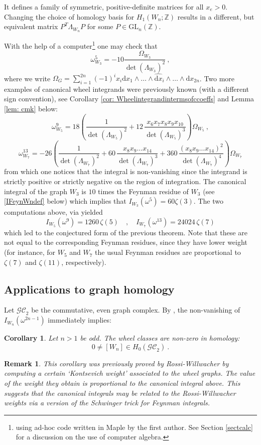 \documentclass[10pt]{amsart}
\newcommand{\ZZ}{{\mathbb Z}}
\newcommand{\dd}{\mathrm{d}}
\theoremstyle{plain}
\newtheorem{cor}[thm]{Corollary}
\newtheorem{remark}[thm]{Remark}
\newcommand{\GL}{\mathrm{GL}}
\newcommand{\GC}{\mathcal{GC}}
\newcommand{\0}{\color{blue}{\mathsf{0}}}
\begin{document}
\noindent 
It defines a family of symmetric, positive-definite matrices for all $x_e>0.$ Changing the choice of homology basis for $H_1(W_n;\ZZ)$ results in a different, but equivalent matrix $P^T \Lambda_{W_n} P$ for some $P \in \GL_n(\ZZ).$

With the help of a computer\footnote{using ad-hoc code written in Maple by the first author. See Section \ref{sectcalc} for a discussion on the use of computer algebra.} one may check that 
\[  \omega^5_{W_3} = -10 \frac{\Omega_{W_3}}{\det(\Lambda_{W_3})^2}\ ,\]
where we write $\Omega_G = \sum_{i=1}^{2n} (-1)^i x_i \dd x_1  \wedge \ldots \wedge \widehat{\dd x}_i\wedge  \ldots \wedge \dd x_{2n}$. 
Two more examples of  canonical wheel integrands  were previously known  \cite[\S10]{BrSigma} (with a different sign convention), see Corollary \ref{cor: Wheelintegrandintermsofccoeffs} and Lemma \ref{lem: cmk} below: 
\[   \omega^9_{W_5} = 18 \left( \frac{1}{\det(\Lambda_{W_5})^2} + 12 \,\frac{ x_6x_7x_8x_9x_{10}}{ \det(\Lambda_{W_5})^3} \right) \Omega_{W_5}\ ,\]
\[   \omega^{13}_{W_7} = -26 \left( \frac{1}{\det(\Lambda_{W_7})^2} +60 \,\frac{ x_8x_9\ldots x_{14}}{ \det(\Lambda_{W_7})^3}
+360 \,\frac{ (x_8x_9\ldots x_{14})^2}{ \det(\Lambda_{W_7})^4}\right) \Omega_{W_7}\]
from which one notices that the integral is non-vanishing since the integrand is strictly positive or strictly negative on the region of integration. 
The canonical integral of the graph $W_3$ is $10$ times the  Feynman residue of $W_3$ (see \eqref{IFeynWndef} below) which implies that $I_{W_3}(\omega^5) = 60 \zeta(3).$ The two computations above, via \cite{BorinskySchnetz} yielded
\[  I_{W_5}(\omega^9) = 1260 \, \zeta(5) \quad , \quad I_{W_7}(\omega^{13}) = 24024 \, \zeta(7) \]
which led to the conjectured form of the previous theorem.  Note that these are not equal to the corresponding Feynman residues, since they have lower weight (for instance, for $W_5$ and $W_7$ the usual Feynman residues are proportional to $\zeta(7)$ and $\zeta(11)$, respectively).

\subsection{Applications to graph homology} Let $\GC_2$ be the commutative, even graph complex.   By \cite[Corollary 8.8]{BrSigma}, the non-vanishing of $I_{W_n}(\omega^{2n-1})$ immediately implies: 

\begin{cor} \label{cor: wheelclassinGC} Let $n>1$ be odd.  The wheel classes are non-zero in  homology: 
\[  0\neq [W_n]  \in H_{0}\left(\GC_2\right) \ .\]
\end{cor}
\begin{remark} This corollary was previously proved by  Rossi-Willwacher \cite{RossiWillwacher} by  computing  a certain   `Kontsevich weight' associated to the wheel graphs. The value of the weight they obtain  is proportional to the canonical integral above. This suggests that   the canonical integrals may be related to the Rossi-Willwacher weights via a version of the  Schwinger trick for  Feynman integrals. 
\end{remark} 
\end{document}
